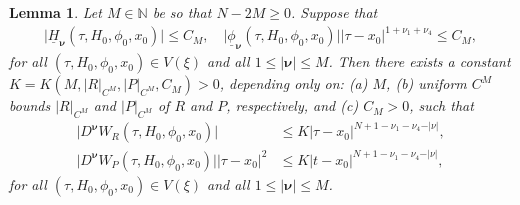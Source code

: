 \documentclass[reqno,12pt]{amsart}
\newcommand{\lemmalab}[1]{\label{lemma:#1}}
\newtheorem{lemma}[theorem]{Lemma}
\numberwithin{equation}{section}
\begin{document}
\begin{lemma}\lemmalab{est}
Let $M\in \mathbb N$ be so that $N-2M\ge 0$.
 Suppose that 
 \begin{align*}
  \vert \underline H_{\mathbf \nu}(\tau,H_0,\phi_0,x_0)\vert \le C_M,\quad \vert \underline \phi_{\mathbf \nu}(\tau,H_0,\phi_0,x_0)\vert \vert \tau-x_0\vert^{1+\nu_1+\nu_4} \le C_M,
 \end{align*}
for all $(\tau,H_0,\phi_0,x_0)\in V(\xi)$ and all $1\le \vert \mathbf \nu\vert\le M$. Then there exists a constant $K=K(M,\vert R\vert_{C^M},\vert P\vert_{C^M},C_M)>0$, depending only on: (a) $M$, (b) uniform $C^M$ bounds $\vert R\vert_{C^M}$ and $\vert P\vert_{C^M}$ of $R$ and $P$, respectively, and (c) $C_M>0$, such that
\begin{align*}
 \vert D^{\mathbf \nu} W_R(\tau,H_0,\phi_0,x_0)\vert& \le K\vert \tau-x_0\vert^{N+1-\nu_1-\nu_4-\vert \nu\vert},\\
  \vert D^{\mathbf \nu} W_P(\tau,H_0,\phi_0,x_0)\vert\vert \tau-x_0\vert^2 &\le K\vert t- x_0\vert^{N+1-\nu_1-\nu_4-\vert \nu\vert},
\end{align*}
for all $(\tau,H_0,\phi_0,x_0) \in V(\xi)$ and all $1\le \vert \mathbf \nu\vert\le M$.
\end{lemma}
\end{document}
